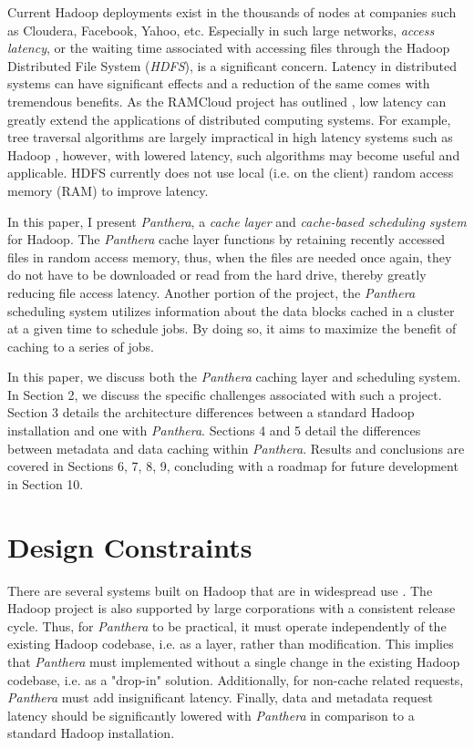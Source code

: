 \documentclass[12pt]{article}
\begin{document}
Current Hadoop deployments exist in the thousands of nodes at companies such as Cloudera, Facebook, Yahoo, etc. Especially in such large networks, \textit{access latency}, or the waiting time associated with accessing files through the Hadoop Distributed File System (\textit{HDFS}), is a significant concern. Latency in distributed systems can have significant effects and a reduction of the same comes with tremendous benefits. As the RAMCloud project has outlined \cite{ramcloud}, low latency can greatly extend the applications of distributed computing systems. For example, tree traversal algorithms are largely impractical in high latency systems such as Hadoop \cite{ramcloud}, however, with lowered latency, such algorithms may become useful and applicable. HDFS currently does not use local (i.e. on the client) random access memory (RAM) to improve latency.

In this paper, I present \textit{Panthera}, a \textit{cache layer} and \textit{cache-based scheduling system} for Hadoop. The \textit{Panthera} cache layer functions by retaining recently accessed files in random access memory, thus, when the files are needed once again, they do not have to be downloaded or read from the hard drive, thereby greatly reducing file access latency. Another portion of the project, the \textit{Panthera} scheduling system utilizes information about the data blocks cached in a cluster at a given time to schedule jobs. By doing so, it aims to maximize the benefit of caching to a series of jobs.

In this paper, we discuss both the \textit{Panthera} caching layer and scheduling system. In Section 2, we discuss the specific challenges associated with such a project. Section 3 details the architecture differences between a standard Hadoop installation and one with \textit{Panthera}.  Sections 4 and 5 detail the differences between metadata and data caching within \textit{Panthera}. Results and conclusions are covered in Sections 6, 7, 8, 9, concluding with a roadmap for future development in Section 10.

\section{Design Constraints}

There are several systems built on Hadoop that are in widespread use \cite{hbase, cloudbatch, pig}. The Hadoop project is also supported by large corporations with a 
consistent release cycle. Thus, for \textit{Panthera} to be practical, it must operate independently of the existing Hadoop codebase, i.e. as a layer, rather than modification. This implies that \textit{Panthera} must implemented without a single change in the existing Hadoop codebase, i.e. as a "drop-in" solution. Additionally, for non-cache related requests, \textit{Panthera} must add insignificant latency. Finally, data and metadata request latency should be significantly lowered with \textit{Panthera} in comparison to a standard Hadoop installation. 
\end{document}
